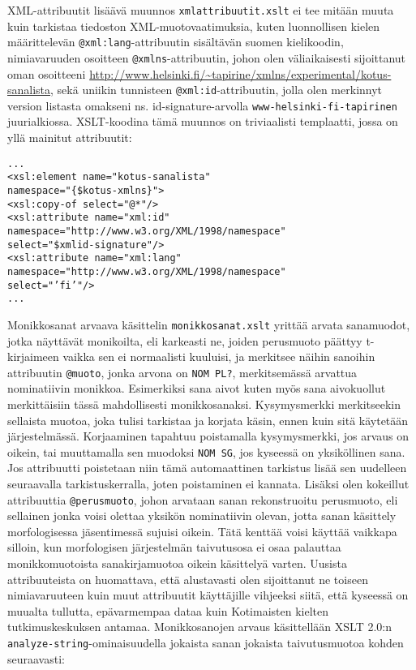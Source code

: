 \documentclass[free]{flammie}
\begin{document}
XML-attribuutit lisäävä muunnos \texttt{xmlattribuutit.xslt} ei tee mitään muuta
kuin tarkistaa tiedoston XML-muotovaatimuksia, kuten luonnollisen kielen
määrittelevän \texttt{@xml:lang}-attribuutin sisältävän suomen kielikoodin,
nimiavaruuden osoitteen \texttt{@xmlns}-attribuutin, johon olen väliaikaisesti
sijoittanut oman osoitteeni
\url{http://www.helsinki.fi/~tapirine/xmlns/experimental/kotus-sanalista}, sekä
uniikin tunnisteen \texttt{@xml:id}-attribuutin, jolla olen merkinnyt version listasta omakseni ns. id-signature-arvolla
\texttt{www-helsinki-fi-tapirinen} juurialkiossa. XSLT-koodina tämä muunnos on triviaalisti templaatti, jossa on yllä mainitut attribuutit:
\begin{verbatim}
...
<xsl:element name="kotus-sanalista"
namespace="{$kotus-xmlns}">
<xsl:copy-of select="@*"/>
<xsl:attribute name="xml:id"
namespace="http://www.w3.org/XML/1998/namespace"
select="$xmlid-signature"/>
<xsl:attribute name="xml:lang"
namespace="http://www.w3.org/XML/1998/namespace"
select="’fi’"/>
...
\end{verbatim}

Monikkosanat arvaava käsittelin \texttt{monikkosanat.xslt} yrittää arvata sanamuodot,
jotka näyttävät monikoilta, eli karkeasti ne, joiden perusmuoto päättyy
t-kirjaimeen vaikka sen ei normaalisti kuuluisi, ja merkitsee näihin sanoihin
attribuutin \texttt{@muoto}, jonka arvona on \texttt{NOM PL?}, merkitsemässä arvattua nominatiivin
monikkoa. Esimerkiksi sana aivot kuten myös sana aivokuollut merkittäisiin tässä
mahdollisesti monikkosanaksi. Kysymysmerkki merkitseekin sellaista muotoa, joka
tulisi tarkistaa ja korjata käsin, ennen kuin sitä käytetään järjestelmässä.
Korjaaminen tapahtuu poistamalla kysymysmerkki, jos arvaus on oikein, tai
muuttamalla sen muodoksi \texttt{NOM SG}, jos kyseessä on yksiköllinen sana. Jos
attribuutti poistetaan niin tämä automaattinen tarkistus lisää sen uudelleen
seuraavalla tarkistuskerralla, joten poistaminen ei kannata. Lisäksi olen
kokeillut attribuuttia \texttt{@perusmuoto}, johon arvataan sanan rekonstruoitu
perusmuoto, eli sellainen jonka voisi olettaa yksikön nominatiivin olevan, jotta
sanan käsittely morfologisessa jäsentimessä sujuisi oikein. Tätä kenttää voisi
käyttää vaikkapa silloin, kun morfologisen järjestelmän taivutusosa ei osaa
palauttaa monikkomuotoista sanakirjamuotoa oikein käsittelyä varten. Uusista
attribuuteista on huomattava, että alustavasti olen sijoittanut ne toiseen
nimiavaruuteen kuin muut attribuutit käyttäjille vihjeeksi siitä, että kyseessä
on muualta tullutta, epävarmempaa dataa kuin Kotimaisten kielten
tutkimuskeskuksen antamaa. Monikkosanojen arvaus käsittellään XSLT 2.0:n
\texttt{analyze-string}-ominaisuudella jokaista sanan jokaista taivutusmuotoa kohden
seuraavasti:
\end{document}
